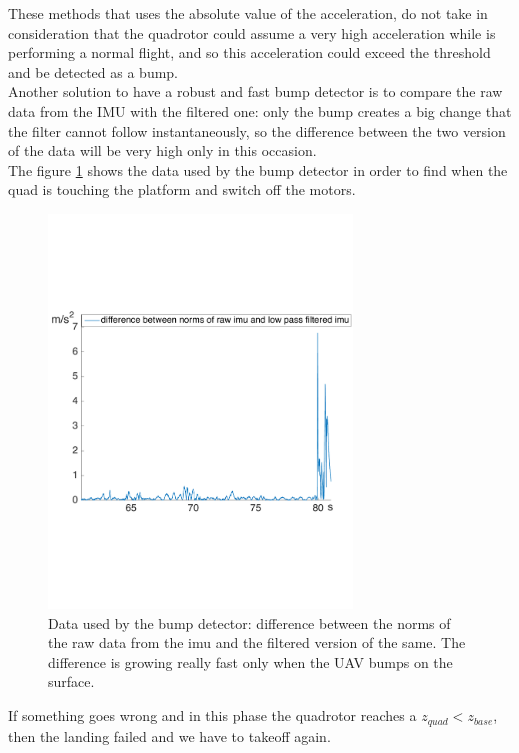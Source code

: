 These methods that uses the absolute value of the acceleration, do not take in consideration that the quadrotor could assume a very high acceleration while is performing a normal flight, and so this acceleration could exceed the threshold and be detected as a bump.\\
Another solution to have a robust and fast bump detector is to compare the raw data from the IMU with the filtered one: only the bump creates a big change that the filter cannot follow instantaneously, so the difference between the two version of the data will be very high only in this occasion.\\
The figure \ref{fig:imu_landing} shows the data used by the bump detector in order to find when the quad is touching the platform and switch off the motors.

\begin{figure}[!htbp]
    \centering
    \includegraphics[width=0.72\textwidth]{img/imu_landing.pdf}
    \caption{Data used by the bump detector: difference between the norms of the raw data from the imu and the filtered version of the same. The difference is growing really fast only when the UAV bumps on the surface.}
    \label{fig:imu_landing}
\end{figure}
 
If something goes wrong and in this phase the quadrotor reaches a $z_{quad} < z_{base}$, then the landing failed and we have to takeoff again.
